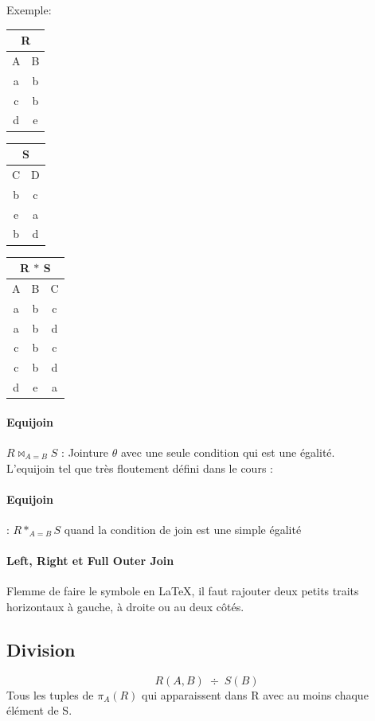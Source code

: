 \documentclass[a4paper]{article}
\begin{document}
    Exemple:
  \begin{tabular}{|c|c|}
	\multicolumn{2}{c}{R}\\
	\hline
	A & B\\
	\hline\hline
	a & b\\
	c & b\\
	d & e\\
	\hline
  \end{tabular}
  \begin{tabular}{|c|c|}
	\multicolumn{2}{c}{S}\\
	\hline
	C & D\\
	\hline\hline
	b & c\\
	e & a\\
	b & d\\
	\hline
  \end{tabular}
  \begin{tabular}{|c|c|c|}
	\multicolumn{3}{c}{\textcolor[rgb]{1,0,0}{R $*$ S}}\\
	\hline
	A & B & C\\
	\hline\hline
	a & b & c\\
	a & b & d\\
	c & b & c\\
	c & b & d\\
	d & e & a\\
	\hline
  \end{tabular}

  \paragraph{Equijoin} $R \bowtie_{A=B} S$ : Jointure $\theta$ avec une seule 
  condition qui est une égalité.\\

  L'equijoin tel que très floutement défini dans le cours :

  \paragraph{Equijoin} : $R *_{A=B} S$ quand la condition de join est une simple égalité

  \paragraph{Left, Right et Full Outer Join} Flemme de faire le symbole en \LaTeX,
  il faut rajouter deux petits traits horizontaux à gauche, à droite ou au deux
  côtés.

  \subsection{Division}
  $$ R(A,B)\; \div\; S(B) $$
  Tous les tuples de $\pi_{A}(R)$ qui apparaissent dans R avec au moins chaque
  élément de S.
\end{document}
